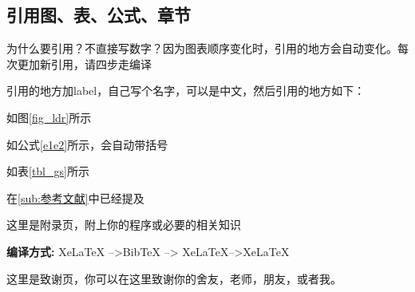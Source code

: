 \documentclass[AutoFakeBold]{LZUThesis2007}
\begin{document}

\subsection{引用图、表、公式、章节} %

为什么要引用？不直接写数字？因为图表顺序变化时，引用的地方会自动变化。每次更加新引用，请四步走编译

引用的地方加label，自己写个名字，可以是中文，然后引用的地方如下：

如图\ref{fig_ldr}所示

如公式\eqref{e1e2}所示，会自动带括号

如表\ref{tbl_gs}所示

在\ref{sub:参考文献}中已经提及


\backmatter


\printbib



\Appendix


这里是附录页，附上你的程序或必要的相关知识

{\bfseries 编译方式:} XeLaTeX -->BibTeX --> XeLaTeX-->XeLaTeX


\Thanks

这里是致谢页，你可以在这里致谢你的舍友，老师，朋友，或者我。








\Grade %
\end{document}
